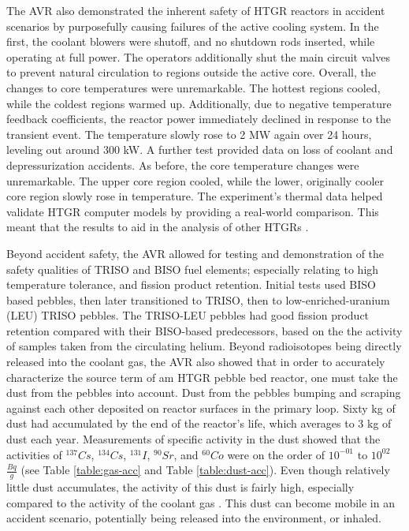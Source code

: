 The AVR also demonstrated the inherent safety of HTGR reactors in accident scenarios by purposefully causing failures of the active cooling system.  In the first, the coolant blowers were shutoff, and no shutdown rods inserted, while operating at full power.  The operators additionally shut the main circuit valves to prevent natural circulation to regions outside the active core.  Overall, the changes to core temperatures were unremarkable.  The hottest regions cooled, while the coldest regions warmed up.  Additionally, due to negative temperature feedback coefficients, the reactor power immediately declined in response to the transient event.  The temperature slowly rose to 2 MW again over 24 hours, leveling out around 300 kW.  A further test provided data on loss of coolant and depressurization accidents.  As before, the core temperature changes were unremarkable.  The upper core region cooled, while the lower, originally cooler core region slowly rose in temperature.  The experiment's thermal data helped validate HTGR computer models by providing a real-world comparison.  This meant that the results to aid in the analysis of other HTGRs \cite{noauthor_results_1990}.

Beyond accident safety, the AVR allowed for testing and demonstration of the safety qualities of TRISO and BISO fuel elements; especially relating to high temperature tolerance, and fission product retention.  Initial tests used BISO based pebbles, then later transitioned to TRISO, then to low-enriched-uranium (LEU) TRISO pebbles.  The TRISO-LEU pebbles had good fission product retention compared with their BISO-based predecessors, based on the the activity of samples taken from the circulating helium.  Beyond radioisotopes being directly released into the coolant gas, the AVR also showed that in order to accurately characterize the source term of am HTGR pebble bed reactor, one must take the dust from the pebbles into account.  Dust from the pebbles bumping and scraping against each other deposited on reactor surfaces in the primary loop.  Sixty kg of dust had accumulated by the end of the reactor's life, which averages to 3 kg of dust each year.  Measurements of specific activity in the dust showed that the activities of $^{137}Cs$, $^{134}Cs$, $^{131}I$, $^{90}Sr$, and $^{60}Co$ were on the order of $10^{-01}$ to $10^{02}$ $\frac{Bq}{g}$ (see Table \ref{table:gas-acc} and Table \ref{table:dust-acc}).  Even though relatively little dust accumulates, the activity of this dust is fairly high, especially compared to the activity of the coolant gas \cite{noauthor_results_1990}.  This dust can become mobile in an accident scenario, potentially being released into the environment, or inhaled.

